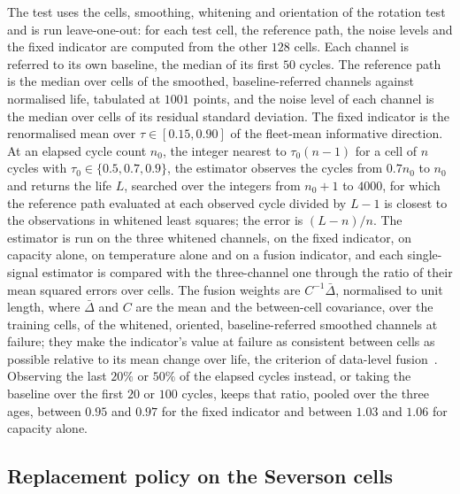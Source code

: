 \documentclass[12pt]{article}
\begin{document}
The test uses the cells, smoothing, whitening and orientation of the rotation
test and is run leave-one-out: for each test cell, the reference path, the
noise levels and the fixed indicator are computed from the other $128$ cells.
Each channel is referred to its own baseline, the median of its first $50$
cycles. The reference path is the median over cells of the smoothed,
baseline-referred channels against normalised life, tabulated at $1001$
points, and the noise level of each channel is the median over cells of its
residual standard deviation. The fixed indicator is the renormalised mean
over $\tau\in[0.15,0.90]$ of the fleet-mean informative direction. At an
elapsed cycle count $n_0$, the integer nearest to $\tau_0(n-1)$ for a cell of
$n$ cycles with $\tau_0\in\{0.5,0.7,0.9\}$, the estimator observes the cycles
from $0.7n_0$ to $n_0$ and returns the life $L$, searched over the integers
from $n_0+1$ to $4000$, for which the reference path evaluated at each
observed cycle divided by $L-1$ is closest to the observations in whitened
least squares; the error is $(L-n)/n$. The estimator is run on the three
whitened channels, on the fixed indicator, on capacity alone, on temperature
alone and on a fusion indicator, and each single-signal estimator is compared
with the three-channel one through the ratio of their mean squared errors
over cells. The fusion weights are $C^{-1}\bar\Delta$, normalised to unit
length, where $\bar\Delta$ and $C$ are the mean and the between-cell
covariance, over the training cells, of the whitened, oriented,
baseline-referred smoothed channels at failure; they make the indicator's
value at failure as consistent between cells as possible relative to its mean
change over life, the criterion of data-level
fusion~\cite{liu2013fusion}.
Observing the last $20\%$ or $50\%$ of the elapsed cycles instead, or taking
the baseline over the first $20$ or $100$ cycles, keeps that ratio, pooled
over the three ages, between $0.95$ and $0.97$ for the fixed indicator
and between $1.03$ and $1.06$ for capacity alone.

\subsection{Replacement policy on the Severson cells}
\end{document}
